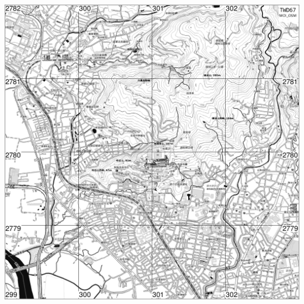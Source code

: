 \documentclass[12pt,landscape]{article}
\begin{document}
\begin{multicols}{2}

\includegraphics[width=32cm, height=32cm]{osm-map.png}


\end{multicols}
\end{document}
